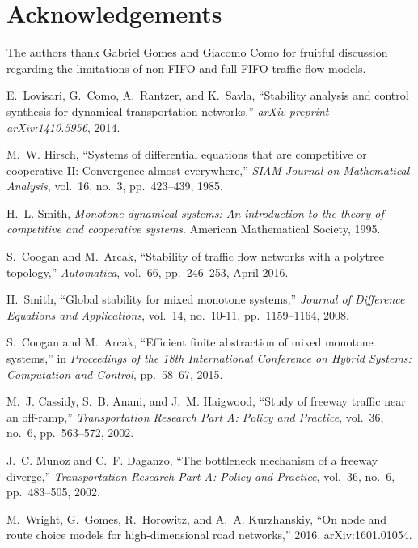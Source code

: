 \documentclass[letterpaper, 10 pt, conference]{ieeeconf}
\begin{document}
\section*{Acknowledgements}
The authors thank Gabriel Gomes and Giacomo Como for fruitful discussion regarding the limitations of non-FIFO and full FIFO traffic flow models.



\begin{thebibliography}{10}

E.~Lovisari, G.~Como, A.~Rantzer, and K.~Savla, ``Stability analysis and
  control synthesis for dynamical transportation networks,'' {\em arXiv
  preprint arXiv:1410.5956}, 2014.

M.~W. Hirsch, ``Systems of differential equations that are competitive or
  cooperative {II}: Convergence almost everywhere,'' {\em SIAM Journal on
  Mathematical Analysis}, vol.~16, no.~3, pp.~423--439, 1985.

H.~L. Smith, {\em Monotone dynamical systems: {A}n introduction to the theory
  of competitive and cooperative systems}.
\newblock American Mathematical Society, 1995.

S.~Coogan and M.~Arcak, ``Stability of traffic flow networks with a polytree
  topology,'' {\em Automatica}, vol.~66, pp.~246--253, April 2016.

H.~Smith, ``Global stability for mixed monotone systems,'' {\em Journal of
  Difference Equations and Applications}, vol.~14, no.~10-11, pp.~1159--1164,
  2008.

S.~Coogan and M.~Arcak, ``Efficient finite abstraction of mixed monotone
  systems,'' in {\em Proceedings of the 18th International Conference on Hybrid
  Systems: Computation and Control}, pp.~58--67, 2015.

M.~J. Cassidy, S.~B. Anani, and J.~M. Haigwood, ``Study of freeway traffic near
  an off-ramp,'' {\em Transportation Research Part A: Policy and Practice},
  vol.~36, no.~6, pp.~563--572, 2002.

J.~C. Munoz and C.~F. Daganzo, ``The bottleneck mechanism of a freeway
  diverge,'' {\em Transportation Research Part A: Policy and Practice},
  vol.~36, no.~6, pp.~483--505, 2002.

M.~Wright, G.~Gomes, R.~Horowitz, and A.~A. Kurzhanskiy, ``On node and route
  choice models for high-dimensional road networks,'' 2016.
\newblock arXiv:1601.01054.


\end{thebibliography}
\end{document}

